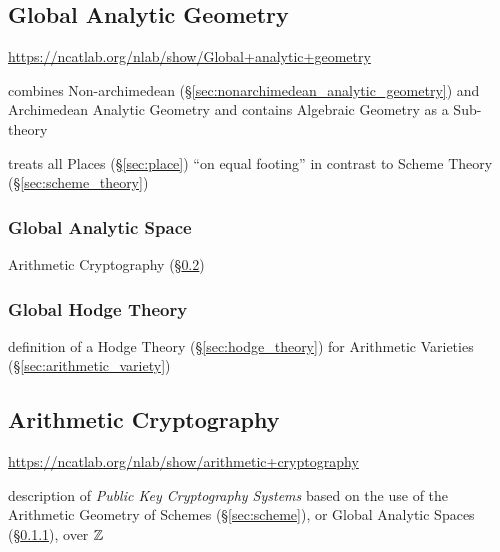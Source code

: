 \subsection{Global Analytic Geometry}\label{sec:global_analytic_geometry}

\url{https://ncatlab.org/nlab/show/Global+analytic+geometry}

combines Non-archimedean (\S\ref{sec:nonarchimedean_analytic_geometry}) and
Archimedean Analytic Geometry and contains Algebraic Geometry as a Sub-theory

\fist treats all Places (\S\ref{sec:place}) ``on equal footing'' in contrast to
Scheme Theory (\S\ref{sec:scheme_theory})



\subsubsection{Global Analytic Space}\label{sec:global_analytic_space}

\fist Arithmetic Cryptography (\S\ref{sec:arithmetic_cryptography})



\subsubsection{Global Hodge Theory}\label{sec:global_hodge_theory}

definition of a Hodge Theory (\S\ref{sec:hodge_theory}) for Arithmetic
Varieties (\S\ref{sec:arithmetic_variety})



\subsection{Arithmetic Cryptography}\label{sec:arithmetic_cryptography}

\url{https://ncatlab.org/nlab/show/arithmetic+cryptography}

description of \emph{Public Key Cryptography Systems} based on the use of the
Arithmetic Geometry of Schemes (\S\ref{sec:scheme}), or Global Analytic Spaces
(\S\ref{sec:global_analytic_space}), over $\mathbb{Z}$

